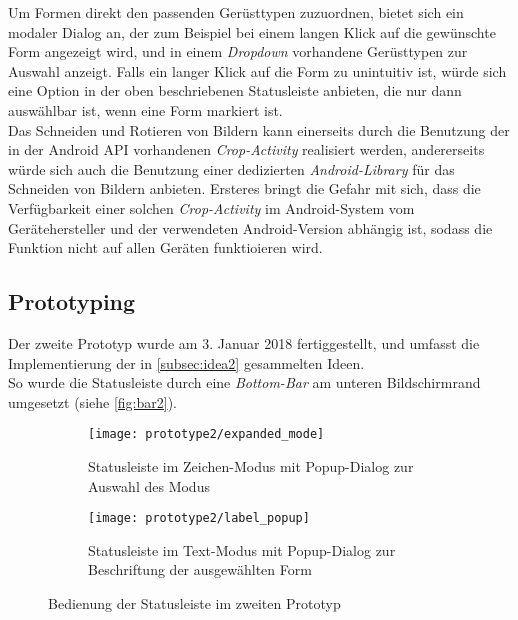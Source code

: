 Um Formen direkt den passenden Gerüsttypen zuzuordnen, bietet sich ein modaler Dialog an, der zum Beispiel bei einem langen Klick auf die gewünschte Form angezeigt wird, und in einem \emph{Dropdown} vorhandene Gerüsttypen zur Auswahl anzeigt.
Falls ein langer Klick auf die Form zu unintuitiv ist, würde sich eine Option in der oben beschriebenen Statusleiste anbieten, die nur dann auswählbar ist, wenn eine Form markiert ist. \\

Das Schneiden und Rotieren von Bildern kann einerseits durch die Benutzung der in der Android API vorhandenen \emph{Crop-Activity} realisiert werden, andererseits würde sich auch die Benutzung einer dedizierten \emph{Android-Library} für das Schneiden von Bildern anbieten.
Ersteres bringt die Gefahr mit sich, dass die Verfügbarkeit einer solchen \emph{Crop-Activity} im Android-System vom Gerätehersteller und der verwendeten Android-Version abhängig ist, sodass die Funktion nicht auf allen Geräten funktioieren wird. 

\subsection{Prototyping}

Der zweite Prototyp wurde am 3. Januar 2018 fertiggestellt, und umfasst die Implementierung der in \autoref{subsec:idea2} gesammelten Ideen. \\

So wurde die Statusleiste durch eine \emph{Bottom-Bar} am unteren Bildschirmrand umgesetzt (siehe \autoref{fig:bar2}).

\begin{figure}[ht]
  \begin{subfigure}[t]{0.4\textwidth}
    \texttt{[image: prototype2/expanded\_mode]}
    \caption{Statusleiste im Zeichen-Modus mit Popup-Dialog zur Auswahl des Modus}
    \label{fig:mode2}
  \end{subfigure}
  \begin{subfigure}[t]{0.4\textwidth}
    \texttt{[image: prototype2/label\_popup]}
    \caption{Statusleiste im Text-Modus mit Popup-Dialog zur Beschriftung der ausgewählten Form}
    \label{fig:labelp2}
  \end{subfigure}
  \centering
  \caption{Bedienung der Statusleiste im zweiten Prototyp}
  \label{fig:bar2}
\end{figure}

